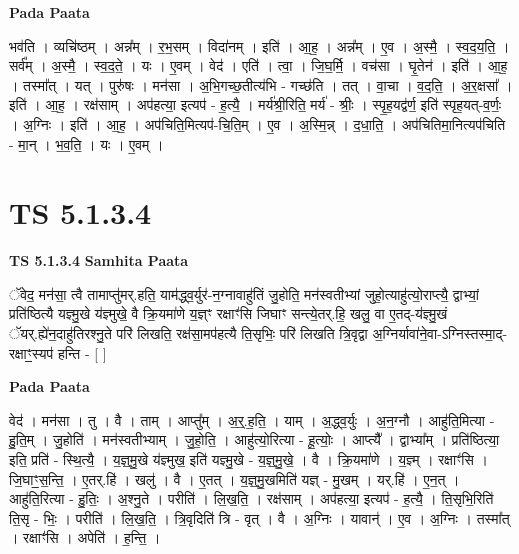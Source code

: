 \documentclass[17pt]{extarticle}
\begin{document}
\textbf{Pada Paata} \newline

भव॑ति । व्यचि॑ष्ठम् । अन्न᳚म् । र॒भ॒सम् । विदा॑नम् । इति॑ । आ॒ह॒ । अन्न᳚म् । ए॒व । अ॒स्मै॒ । स्व॒द॒य॒ति॒ । सर्व᳚म् । अ॒स्मै॒ । स्व॒द॒ते॒ । यः । ए॒वम् । वेद॑ । एति॑ । त्वा॒ । जि॒घ॒र्मि॒ । वच॑सा । घृ॒तेन॑ । इति॑ । आ॒ह॒ । तस्मा᳚त् । यत् । पुरु॑षः । मन॑सा । अ॒भि॒गच्छ॒तीत्य॑भि - गच्छ॑ति । तत् । वा॒चा । व॒द॒ति॒ । अ॒र॒क्षसा᳚ । इति॑ । आ॒ह॒ । रक्ष॑साम् । अप॑हत्या॒ इत्यप॑ - ह॒त्यै॒ । मर्य॑श्री॒रिति॒ मर्य॑ - श्रीः॒ । स्पृ॒ह॒यद्व॑र्ण॒ इति॑ स्पृह॒यत्-व॒र्णः॒ । अ॒ग्निः । इति॑ । आ॒ह॒ । अप॑चिति॒मित्यप॑-चि॒ति॒म् । ए॒व । अ॒स्मि॒न्न् । द॒धा॒ति॒ । अप॑चितिमा॒नित्यप॑चिति - मा॒न् । भ॒व॒ति॒ । यः । ए॒वम् ।  \newline




\section*{ TS 5.1.3.4 }

\textbf{TS 5.1.3.4 } \newline
\textbf{Samhita Paata} \newline

ॅवेद॒ मन॑सा॒ त्वै तामाप्तु॑मर्.हति॒ याम॑द्ध्व॒र्युर॑-न॒ग्नावाहु॑तिं जु॒होति॒ मन॑स्वतीभ्यां जुहो॒त्याहु॑त्यो॒राप्त्यै॒ द्वाभ्यां॒ प्रति॑ष्ठित्यै यज्ञ्मु॒खे य॑ज्ञ्मुखे॒ वै क्रि॒यमा॑णे य॒ज्ञ्ꣳ रक्षाꣳ॑सि जिघाꣳ सन्त्ये॒तर्.हि॒ खलु॒ वा ए॒तद्-य॑ज्ञ्मु॒खं ॅयर्.ह्ये॑न॒दाहु॑तिरश्नु॒ते परि॑ लिखति॒ रक्ष॑सा॒मप॑हत्यै ति॒सृभिः॒ परि॑ लिखति त्रि॒वृद्वा अ॒ग्निर्यावा॑ने॒वा-ऽग्निस्तस्मा॒द्-रक्षाꣳ॒॒स्यप॑ हन्ति - [  ] \newline

\textbf{Pada Paata} \newline

वेद॑ । मन॑सा । तु । वै । ताम् । आप्तु᳚म् । अ॒र्॒.ह॒ति॒ । याम् । अ॒द्ध्व॒र्युः । अ॒न॒ग्नौ । आहु॑ति॒मित्या - हु॒ति॒म् । जु॒होति॑ । मन॑स्वतीभ्याम् । जु॒हो॒ति॒ । आहु॑त्यो॒रित्या - हू॒त्योः॒ । आप्त्यै᳚ । द्वाभ्या᳚म् । प्रति॑ष्ठित्या॒ इति॒ प्रति॑ - स्थि॒त्यै॒ । य॒ज्ञ्॒मु॒खे य॑ज्ञ्मुख॒ इति॑ यज्ञ्मु॒खे - य॒ज्ञ्॒मु॒खे॒ । वै । क्रि॒यमा॑णे । य॒ज्ञ्म् । रक्षाꣳ॑सि । जि॒घाꣳ॒॒स॒न्ति॒ । ए॒तर्.हि॑ । खलु॑ । वै । ए॒तत् । य॒ज्ञ्॒मु॒खमिति॑ यज्ञ् - मु॒खम् । यर्.हि॑ । ए॒न॒त् । आहु॑ति॒रित्या - हु॒तिः॒ । अ॒श्नु॒ते । परीति॑ । लि॒ख॒ति॒ । रक्ष॑साम् । अप॑हत्या॒ इत्यप॑ - ह॒त्यै॒ । ति॒सृभि॒रिति॑ ति॒सृ - भिः॒ । परीति॑ । लि॒ख॒ति॒ । त्रि॒वृदिति॑ त्रि - वृत् । वै । अ॒ग्निः । यावान्॑ । ए॒व । अ॒ग्निः । तस्मा᳚त् । रक्षाꣳ॑सि । अपेति॑ । ह॒न्ति॒ ।  \newline
\end{document}
